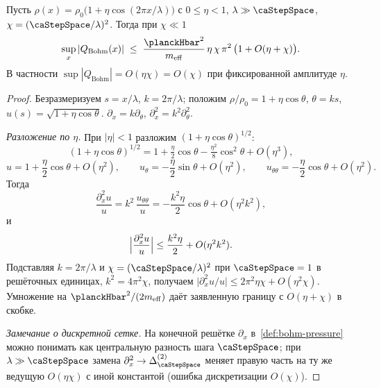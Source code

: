 \begin{lemma}
\label{lem:bohm-chi}
Пусть $\rho(x)=\rho_0\bigl(1+\eta\cos(2\pi x/\lambda)\bigr)$ с $0\le\eta<1$,
$\lambda\gg\caStepSpace$, $\chi=(\caStepSpace/\lambda)^2$.
Тогда при $\chi\ll 1$
\[
  \sup_x |Q_{\mathrm{Bohm}}(x)|
  \;\le\;
  \frac{\planckHbar^2}{m_{\mathrm{eff}}}\,
  \eta\,\chi\,\pi^2\,\bigl(1+O(\eta+\chi)\bigr).
\]
В частности $\sup|Q_{\mathrm{Bohm}}|=O(\eta\chi)=O(\chi)$ при фиксированной амплитуде $\eta$.
\end{lemma}

\begin{proof}
Безразмеризуем $s=x/\lambda$, $k=2\pi/\lambda$; положим $\rho/\rho_0=1+\eta\cos\theta$, $\theta=ks$,
$u(s)=\sqrt{1+\eta\cos\theta}$.
\phence $\partial_x=k\partial_\theta$, $\partial_x^2=k^2\partial_\theta^2$.

\smallskip
\emph{Разложение по $\eta$.}
При $|\eta|<1$ разложим $(1+\eta\cos\theta)^{1/2}$:
\[
  (1+\eta\cos\theta)^{1/2}
  =1+\tfrac{\eta}{2}\cos\theta-\tfrac{\eta^2}{8}\cos^2\theta+O(\eta^3),
\]
\pfollows
\[
  u=1+\frac{\eta}{2}\cos\theta+O(\eta^2),\qquad
  u_\theta=-\frac{\eta}{2}\sin\theta+O(\eta^2),\qquad
  u_{\theta\theta}=-\frac{\eta}{2}\cos\theta+O(\eta^2).
\]
Тогда
\[
  \frac{\partial_x^2 u}{u}
  =k^2\,\frac{u_{\theta\theta}}{u}
  =-\frac{k^2\eta}{2}\cos\theta+O(\eta^2 k^2),
\]
и
\[
  \Bigl|\frac{\partial_x^2 u}{u}\Bigr|
  \le\frac{k^2\eta}{2}+O(\eta^2 k^2).
\]
Подставляя $k=2\pi/\lambda$ и $\chi=(\caStepSpace/\lambda)^2$ при $\caStepSpace=1$ в решёточных единицах,
$k^2=4\pi^2\chi$, получаем
$\bigl|\partial_x^2 u/u\bigr|\le 2\pi^2\eta\chi+O(\eta^2\chi)$.
Умножение на $\planckHbar^2/(2m_{\mathrm{eff}})$ даёт заявленную границу с $O(\eta+\chi)$ в скобке.

\smallskip
\emph{Замечание о дискретной сетке.}
На конечной решётке $\partial_x$ в~\cref{def:bohm-pressure} можно понимать как центральную разность
шага $\caStepSpace$; при $\lambda\gg\caStepSpace$ замена $\partial_x^2\to\Delta^{(2)}_{\caStepSpace}$
меняет правую часть на ту же ведущую $O(\eta\chi)$ с иной константой
(ошибка дискретизации $O(\chi)$).
\end{proof}

